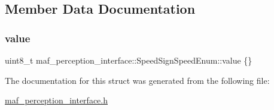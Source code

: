 \subsection{Member Data Documentation}
\mbox{\label{structmaf__perception__interface_1_1SpeedSignSpeedEnum_accc45a38c91a6dd0d7b362f5ef0ce5ea}} 
\subsubsection{\texorpdfstring{value}{value}}
{\footnotesize\ttfamily uint8\+\_\+t maf\+\_\+perception\+\_\+interface\+::\+Speed\+Sign\+Speed\+Enum\+::value \{\}}



The documentation for this struct was generated from the following file\+:\begin{DoxyCompactItemize}
\item 
\hyperlink{maf__perception__interface_8h}{maf\+\_\+perception\+\_\+interface.\+h}\end{DoxyCompactItemize}
